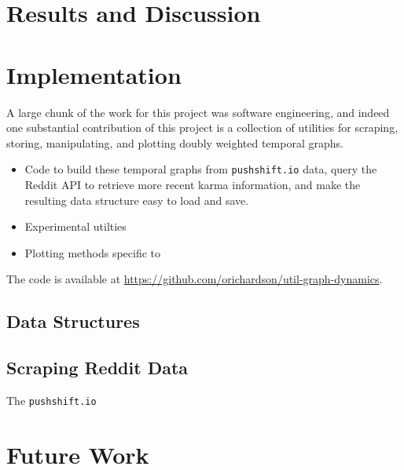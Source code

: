 \documentclass{article}
\theoremstyle{definition}
\begin{document}
	
	\section{Results and Discussion}
	
	\section{Implementation}
	A large chunk of the work for this project was software engineering, and indeed one substantial contribution of this project is a collection of utilities for scraping, storing, manipulating, and plotting doubly weighted temporal graphs.
	
	\begin{itemize}
		\item Code to build these temporal graphs from \texttt{pushshift.io} data, query the Reddit API to retrieve more recent karma information, and make the resulting data structure easy to load and save.
		
		\item Experimental utilties
		
		\item Plotting methods specific to 
	\end{itemize}
	
	
	The code is available at \url{https://github.com/orichardson/util-graph-dynamics}. 
	
	\subsection{Data Structures}
	
	\subsection{Scraping Reddit Data}
	The \texttt{pushshift.io}
	
	\section{Future Work}
	
	
	
	
%	
	
\end{document}

